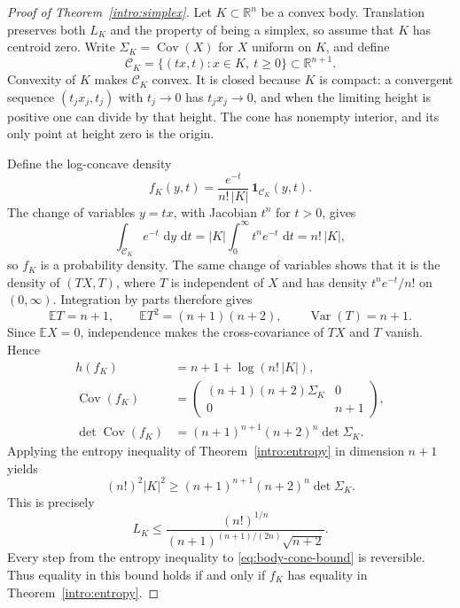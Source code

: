 \documentclass[11pt]{article}
\newcommand{\R}{\mathbb R}
\newcommand{\E}{\mathbb E}
\DeclareMathOperator{\Cov}{Cov}
\DeclareMathOperator{\Var}{Var}
\newcommand{\dd}{\,\mathrm d}
\theoremstyle{definition}
\theoremstyle{remark}
\numberwithin{equation}{section}
\begin{document}
\begin{proof}[Proof of Theorem~\ref{intro:simplex}]
Let $K\subset\R^n$ be a convex body.  Translation preserves both $L_K$
and the property of being a simplex, so assume that $K$ has centroid
zero.  Write $\Sigma_K=\Cov(X)$ for $X$ uniform on $K$, and define
\begin{equation}\label{eq:body-cone}
  \mathcal C_K=\{(tx,t):x\in K,\ t\geq0\}\subset\R^{n+1}.
\end{equation}
Convexity of $K$ makes $\mathcal C_K$ convex.  It is closed because $K$
is compact: a convergent sequence $(t_jx_j,t_j)$ with $t_j\to0$ has
$t_jx_j\to0$, and when the limiting height is positive one can divide
by that height.  The cone has nonempty interior, and its only point
at height zero is the origin.

Define the log-concave density
\begin{equation}\label{eq:body-cone-density}
  f_K(y,t)=\frac{e^{-t}}{n!\,|K|}\,
  \mathbf 1_{\mathcal C_K}(y,t).
\end{equation}
The change of variables $y=tx$, with Jacobian $t^n$ for $t>0$, gives
\[
  \int_{\mathcal C_K}e^{-t}\,\dd y\,\dd t
  =|K|\int_0^\infty t^ne^{-t}\,\dd t=n!\,|K|,
\]
so $f_K$ is a probability density.  The same change of variables shows
that it is the density of $(TX,T)$, where $T$ is independent of $X$
and has density $t^ne^{-t}/n!$ on $(0,\infty)$.  Integration by parts
therefore gives
\[
  \E T=n+1,\qquad
  \E T^2=(n+1)(n+2),\qquad
  \Var(T)=n+1.
\]
Since $\E X=0$, independence makes the cross-covariance of $TX$ and
$T$ vanish.  Hence
\begin{align}
  h(f_K)&=n+1+\log(n!\,|K|),\label{eq:body-cone-entropy}\\
  \Cov(f_K)&=
  \begin{pmatrix}
    (n+1)(n+2)\Sigma_K&0\\
    0&n+1
  \end{pmatrix},\label{eq:body-cone-covariance}\\
  \det\Cov(f_K)&=(n+1)^{n+1}(n+2)^n\det\Sigma_K.
  \label{eq:body-cone-determinant}
\end{align}
Applying the entropy inequality of Theorem~\ref{intro:entropy} in
dimension $n+1$ yields
\begin{equation}\label{eq:body-cone-bound}
  (n!)^2|K|^2\geq
  (n+1)^{n+1}(n+2)^n\det\Sigma_K.
\end{equation}
This is precisely
\[
  L_K\leq
  \frac{(n!)^{1/n}}{(n+1)^{(n+1)/(2n)}\sqrt{n+2}}.
\]
Every step from the entropy inequality to \eqref{eq:body-cone-bound}
is reversible.  Thus equality in this bound holds if and only if
$f_K$ has equality in Theorem~\ref{intro:entropy}.


\end{proof}
\end{document}
